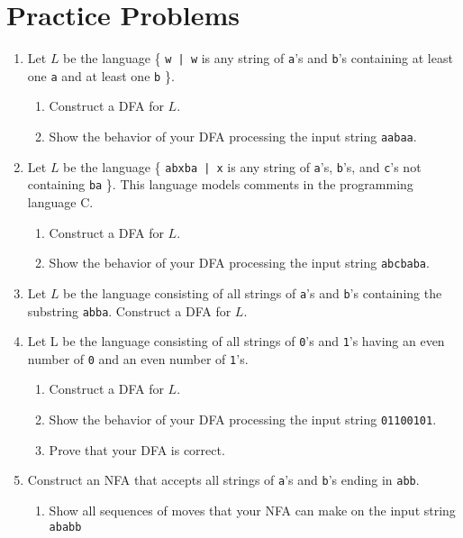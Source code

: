 \documentclass[]{article}
\begin{document}
\section{Practice Problems}
  \begin{enumerate}
    \item Let $L$ be the language \{ \texttt{w | w} is any string of 
    \texttt{a}'s and \texttt{b}'s containing at least one \texttt{a} and at 
    least one \texttt{b} \}.
      \begin{enumerate}
        \item Construct a DFA for $L$.
        \item Show the behavior of your DFA processing the input string 
        \texttt{aabaa}.
      \end{enumerate}
    \item Let $L$ be the language \{ \texttt{abxba | x} is any string of 
    \texttt{a}'s, \texttt{b}'s, and \texttt{c}'s not containing \texttt{ba} \}. 
    This language models comments in the programming language C.
      \begin{enumerate}
        \item Construct a DFA for $L$.
        \item Show the behavior of your DFA processing the input string 
        \texttt{abcbaba}.
      \end{enumerate}
    \item Let $L$ be the language consisting of all strings of \texttt{a}'s and 
    \texttt{b}'s containing the substring \texttt{abba}. Construct a DFA for $L$.
    \item Let L be the language consisting of all strings of \texttt{0}'s and 
    \texttt{1}'s having an even number of \texttt{0} and an even number of 
    \texttt{1}'s.
      \begin{enumerate}
        \item Construct a DFA for $L$.
        \item Show the behavior of your DFA processing the input string 
        \texttt{01100101}.
        \item Prove that your DFA is correct.
      \end{enumerate}
    \item Construct an NFA that accepts all strings of \texttt{a}'s and 
    \texttt{b}'s ending in \texttt{abb}.
      \begin{enumerate}
        \item Show all sequences of moves that your NFA can make on the input 
        string \texttt{ababb}

\end{enumerate}
\end{enumerate}
\end{document}
